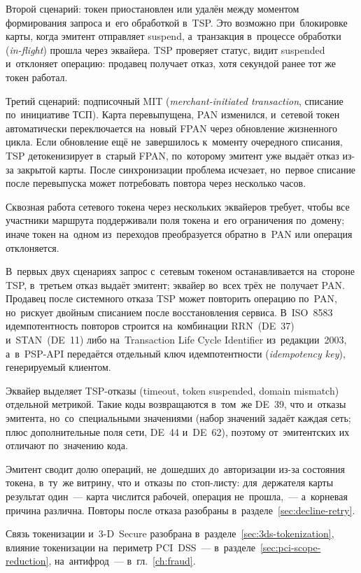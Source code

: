 Второй сценарий: токен приостановлен или удалён между моментом формирования
запроса и~его обработкой в~TSP. Это возможно при~блокировке карты, когда
эмитент отправляет suspend, а~транзакция в~процессе обработки
(\textit{in-flight}) прошла через эквайера. TSP проверяет статус, видит
suspended и~отклоняет операцию: продавец получает отказ, хотя секундой ранее
тот же токен работал.

Третий сценарий: подписочный MIT (\textit{merchant-initiated transaction},
списание по~инициативе ТСП). Карта перевыпущена, PAN изменился, и~сетевой токен
автоматически переключается на~новый FPAN через обновление жизненного цикла. Если обновление ещё не~завершилось
к~моменту очередного списания, TSP детокенизирует в~старый FPAN, по~которому
эмитент уже выдаёт отказ из-за закрытой карты. После синхронизации проблема
исчезает, но~первое списание после перевыпуска может потребовать повтора через
несколько часов.

Сквозная работа сетевого токена через нескольких эквайеров требует, чтобы все
участники маршрута поддерживали поля токена и~его ограничения по~домену; иначе
токен на~одном из~переходов преобразуется обратно в~PAN или операция
отклоняется.

В~первых двух сценариях запрос с~сетевым токеном останавливается на~стороне TSP,
в~третьем отказ выдаёт эмитент; эквайер во~всех трёх не~получает PAN.
Продавец после системного отказа
TSP может повторить операцию по~PAN, но~рискует двойным списанием после
восстановления сервиса. В~ISO~8583 идемпотентность повторов строится
на~комбинации RRN~(DE~37) и~STAN~(DE~11) либо на~Transaction Life Cycle
Identifier из~редакции~2003, а~в~PSP-API передаётся отдельный
ключ идемпотентности (\textit{idempotency key}), генерируемый клиентом.

Эквайер выделяет TSP-отказы (timeout, token suspended, domain mismatch)
отдельной метрикой. Такие коды возвращаются в~том~же DE~39, что и~отказы
эмитента, но~со~специальными значениями (набор значений задаёт каждая сеть; плюс
дополнительные поля сети, DE~44 и~DE~62), поэтому от~эмитентских их отличают
по~значению кода.

Эмитент сводит долю операций, не~дошедших до~авторизации из-за состояния
токена, в~ту~же витрину, что и~отказы по~стоп-листу: для~держателя карты
результат один~--- карта числится рабочей, операция не~прошла,~--- а~корневая
причина различна. Повторы после отказа разобраны
в~разделе~\ref{sec:decline-retry}.

Связь токенизации и~3-D~Secure разобрана в~разделе~\ref{sec:3ds-tokenization},
влияние токенизации на~периметр PCI~DSS~---
в~разделе~\ref{sec:pci-scope-reduction}, на~антифрод~---
в~гл.~\ref{ch:fraud}.
